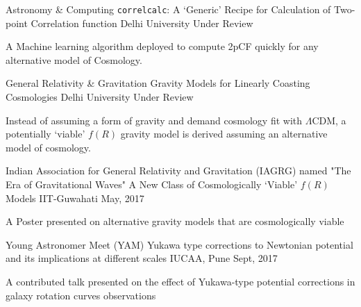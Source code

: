 

\begin{cventries}
	
		\cventry
		{Astronomy \& Computing} %
		{\texttt{correlcalc}: A `Generic' Recipe for Calculation of Two-point Correlation function} %
		{Delhi University} %
		{Under Review} %
		{
			\begin{cvitems} %
				\item {A Machine learning algorithm deployed to compute 2pCF quickly for any alternative model of Cosmology.}
			\end{cvitems}		
		}
	
  \cventry
    {General Relativity \& Gravitation} %
    {Gravity Models for Linearly Coasting Cosmologies} %
    {Delhi University} %
    {Under Review} %
    {
      \begin{cvitems} %
        \item {Instead of assuming a form of gravity and demand cosmology fit with $\Lambda$CDM, a potentially `viable' $f(R)$ gravity model is derived assuming an alternative model of cosmology.}
      \end{cvitems}		
    }

\cventry
{Indian Association for General Relativity and Gravitation (IAGRG) named "The Era of Gravitational Waves"} %
{A New Class of Cosmologically `Viable' $f(R)$ Models} %
{IIT-Guwahati} %
{May, 2017} %
{
	\begin{cvitems} %
		\item {A Poster presented on alternative gravity models that are cosmologically viable}
	\end{cvitems}		
}

\cventry
{Young Astronomer Meet (YAM)} %
{Yukawa type corrections to Newtonian potential and its implications at different scales} %
{IUCAA, Pune} %
{Sept, 2017} %
{
	\begin{cvitems} %
		\item {A contributed talk presented on the effect of Yukawa-type potential corrections in galaxy rotation curves observations}
	\end{cvitems}		
}


\end{cventries}
